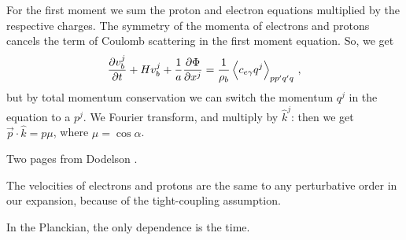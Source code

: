 \documentclass[main.tex]{subfiles}
\begin{document}
For the first moment we sum the proton and electron equations multiplied by the respective charges. 
The symmetry of the momenta of electrons and protons cancels the term of Coulomb scattering in the first moment equation. So, we get 
%
\begin{align}
\pdv{v^{j}_{b}}{t} + H v_b^{j} + \frac{1}{a} \pdv{\Phi }{x^{j}} 
=\frac{1}{\rho_{b}} \expval{c_{e \gamma } q^{j}}_{pp'q'q}
\,,
\end{align}
%
but by total momentum conservation we can switch the momentum \(q^{j} \) in the equation to a \(p^{j}\). 
We Fourier transform, and multiply by \(\hat{k}^{j}\): then we get \(\vec{p} \cdot \hat{k} = p \mu \), where \( \mu = \cos \alpha \). 

Two pages from Dodelson \cite[]{dodelsonModernCosmology2003}.

The velocities of electrons and protons are the same to any perturbative order in our expansion, because of the tight-coupling assumption. 

In the Planckian, the only dependence is the time.
\end{document}
